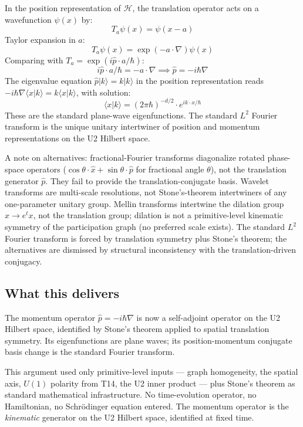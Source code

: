 \documentclass[11pt,a4paper]{article}
\begin{document}
In the position representation of $\mathcal{H}$, the translation operator acts on a wavefunction $\psi(x)$ by:
\[
T_a \psi(x) = \psi(x - a)
\]
Taylor expansion in $a$:
\[
T_a \psi(x) = \exp(-a \cdot \nabla) \psi(x)
\]
Comparing with $T_a = \exp(i \hat{p} \cdot a / \hbar)$:
\[
i \hat{p} \cdot a / \hbar = -a \cdot \nabla \implies \hat{p} = -i\hbar \nabla
\]
The eigenvalue equation $\hat{p}|k\rangle = k|k\rangle$ in the position representation reads $-i\hbar\nabla\langle x|k\rangle = k\langle x|k\rangle$, with solution:
\[
\langle x|k\rangle = (2\pi \hbar)^{-d/2} \cdot e^{ik \cdot x/\hbar}
\]
These are the standard plane-wave eigenfunctions. The standard $L^2$ Fourier transform is the unique unitary intertwiner of position and momentum representations on the U2 Hilbert space.

A note on alternatives: fractional-Fourier transforms diagonalize rotated phase-space operators ($\cos\theta \cdot \hat{x} + \sin\theta \cdot \hat{p}$ for fractional angle $\theta$), not the translation generator $\hat{p}$. They fail to provide the translation-conjugate basis. Wavelet transforms are multi-scale resolutions, not Stone's-theorem intertwiners of any one-parameter unitary group. Mellin transforms intertwine the dilation group $x \to e^t x$, not the translation group; dilation is not a primitive-level kinematic symmetry of the participation graph (no preferred scale exists). The standard $L^2$ Fourier transform is forced by translation symmetry plus Stone's theorem; the alternatives are dismissed by structural inconsistency with the translation-driven conjugacy.

\subsection{What this delivers}

The momentum operator $\hat{p} = -i\hbar\nabla$ is now a self-adjoint operator on the U2 Hilbert space, identified by Stone's theorem applied to spatial translation symmetry. Its eigenfunctions are plane waves; its position-momentum conjugate basis change is the standard Fourier transform.

This argument used only primitive-level inputs --- graph homogeneity, the spatial axis, $U(1)$ polarity from T14, the U2 inner product --- plus Stone's theorem as standard mathematical infrastructure. No time-evolution operator, no Hamiltonian, no Schr\"odinger equation entered. The momentum operator is the \emph{kinematic} generator on the U2 Hilbert space, identified at fixed time.
\end{document}
